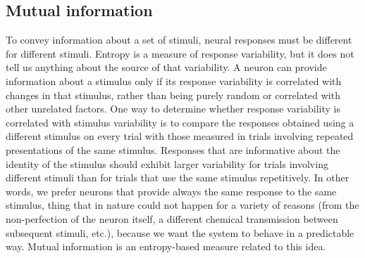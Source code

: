 \subsection{Mutual information}
To convey information about a set of stimuli, neural responses must be different for different stimuli. Entropy is a measure of response variability, but it does not tell us anything about the source of that variability. A neuron can provide information about a stimulus only if its response variability is correlated with changes in that stimulus, rather than being purely random or correlated with other unrelated factors. One way to determine whether response variability is correlated with stimulus variability is to compare the responses obtained using a different stimulus on every trial with those measured in trials involving repeated presentations of the same stimulus. Responses that are informative about the identity of the stimulus should exhibit larger variability for trials involving different stimuli than for trials that use the same stimulus repetitively. In other words, we prefer neurons that provide always the same response to the same stimulus, thing that in nature could not happen for a variety of reasons (from the non-perfection of the neuron itself, a different chemical transmission between subsequent stimuli, etc.), because we want the system to behave in a predictable way. Mutual information is an entropy-based measure related to this idea.

